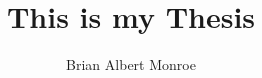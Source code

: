 \documentclass[11pt,a4paper]{report}
\title{This is my Thesis}
\author{Brian Albert Monroe}
\makeatletter
\newcommand{\lltoc}[1]{
	\pagenumbering{gobble}
	\makeatletter
	\@starttoc{toc}%
	\makeatother
	\break
	\pagenumbering{arabic}
}
\let\oldchapter\chapter
\renewcommand{\chapter}[1]{
	\refstepcounter{chapter}%
	\oldchapter*{{\huge Chapter \thechapter}\\[1em]#1}
}
\newcommand{\onlyinsubfile}[1]{#1}
\newcommand{\notinsubfile}[1]{}
\makeatother
\begin{document}
\renewcommand{\onlyinsubfile}[1]{}
\renewcommand{\notinsubfile}[1]{#1}
\renewcommand{\lltoc}[1]{}
\let\chapter\oldchapter

\maketitle
\onehalfspacing
\tableofcontents






\printbibliography
\end{document}

